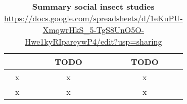 \begin{table}
\centering
\caption[Summary social insect studies]{\textbf{Summary social insect studies} \url{https://docs.google.com/spreadsheets/d/1eKuPU-XmqwrHkS_5-TgS8UnO5O-Hwe1kyRIpareywP4/edit?usp=sharing}}
\label{tab:studies}
\vspace*{5mm}
\begin{tabular}{ccc}
	\toprule
	{}  & TODO & TODO \\
	\midrule

	x & x & x\\
	x & x & x\\
	\bottomrule
\end{tabular}
\end{table}